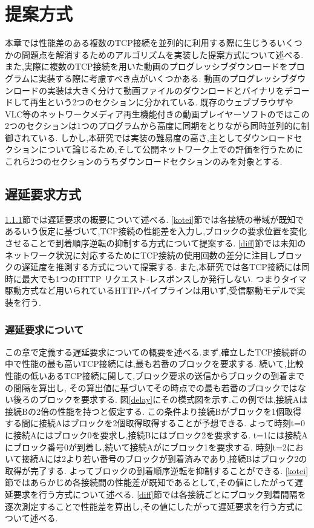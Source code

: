 \documentclass[a4j,12pt]{gradthesis_utf8}
\begin{document}
\chapter{提案方式}\label{sec:sec3}
本章では性能差のある複数のTCP接続を並列的に利用する際に生じうるいくつかの問題点を解消するためのアルゴリズムを実装した提案方式について述べる.
また,実際に複数のTCP接続を用いた動画のプログレッシブダウンロードをプログラムに実装する際に考慮すべき点がいくつかある.
動画のプログレッシブダウンロードの実装は大きく分けて動画ファイルのダウンロードとバイナリをデコードして再生という2つのセクションに分かれている.
既存のウェブブラウザやVLC\cite{vlc}等のネットワークメディア再生機能付きの動画プレイヤーソフトのではこの2つのセクションは1つのプログラムから高度に同期をとりながら同時並列的に制御されている.
しかし,本研究では実装の難易度の高さ,主としてダウンロードセクションについて論じるため,そして公開ネットワーク上での評価を行うためにこれら2つのセクションのうちダウンロードセクションのみを対象とする.

\section{遅延要求方式}
\label{chienyokyuhoshiki}
\ref{chienyokyu}節では遅延要求の概要について述べる.
\ref{kotei}節では各接続の帯域が既知であるいう仮定に基づいて,TCP接続の性能差を入力し,ブロックの要求位置を変化させることで到着順序逆転の抑制する方式について提案する.
\ref{diff}節では未知のネットワーク状況に対応するためにTCP接続の使用回数の差分に注目しブロックの遅延度を推測する方式について提案する.
また,本研究では各TCP接続には同時に最大でも1つのHTTP リクエスト-レスポンスしか発行しない.
つまりタイマ駆動方式など用いられているHTTP-パイプラインは用いず,受信駆動モデルで実装を行う.

\newpage

\subsection{遅延要求について}
\label{chienyokyu}
この章で定義する遅延要求についての概要を述べる.まず,確立したTCP接続群の中で性能の最も高いTCP接続には,最も若番のブロックを要求する.
続いて,比較性能の低いあるTCP接続に関して,ブロック要求の送信からブロックの到着までの間隔を算出し,
その算出値に基づいてその時点での最も若番のブロックではない後ろのブロックを要求する.
図\ref{delay}にその模式図を示す.この例では,接続Aは接続Bの2倍の性能を持つと仮定する.
この条件より接続Bがブロックを1個取得する間に接続Aはブロックを2個取得取得することが予想できる.
よって時刻t=0に接続Aにはブロック0を要求し,接続Bにはブロック2を要求する.
t=1には接続Aにブロック番号0が到着し,続いて接続Aがにブロック1を要求する.
時刻t=2において接続Aには2より若い番号のブロックが到着済みであり,接続Bはブロック2の取得が完了する.
よってブロックの到着順序逆転を抑制することができる.
\ref{kotei}節ではあらかじめ各接続間の性能差が既知であるとして,その値にしたがって遅延要求を行う方式について述べる.
\ref{diff}節では各接続ごとにブロック到着間隔を逐次測定することで性能差を算出し,その値にしたがって遅延要求を行う方式について述べる.
\end{document}
